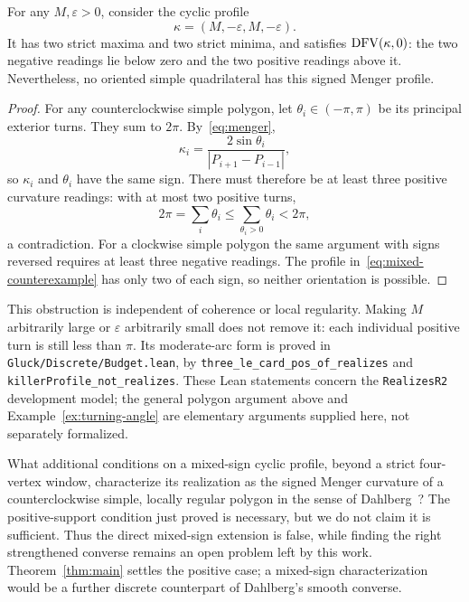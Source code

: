 \begin{example}\label{ex:mixed-sign}
For any $M,\varepsilon>0$, consider the cyclic profile
\begin{equation}\label{eq:mixed-counterexample}
 \kappa=(M,-\varepsilon,M,-\varepsilon).
\end{equation}
It has two strict maxima and two strict minima, and satisfies
$\operatorname{DFV}(\kappa,0)$: the two negative readings lie below zero and the two
positive readings above it. Nevertheless, no oriented simple quadrilateral
has this signed Menger profile.
\end{example}

\begin{proof}
For any counterclockwise simple polygon, let $\theta_i\in(-\pi,\pi)$ be its
principal exterior turns. They sum to $2\pi$. By~\eqref{eq:menger},
\[
 \kappa_i=\frac{2\sin\theta_i}{|P_{i+1}-P_{i-1}|},
\]
so $\kappa_i$ and $\theta_i$ have the same sign. There must therefore be at
least three positive curvature readings: with at most two positive turns,
\[
 2\pi=\sum_i\theta_i
 \le \sum_{\theta_i>0}\theta_i<2\pi,
\]
a contradiction. For a clockwise simple polygon the same argument with
signs reversed requires at least three negative readings. The profile
in~\eqref{eq:mixed-counterexample} has only two of each sign, so neither
orientation is possible.
\end{proof}

This obstruction is independent of coherence or local regularity. Making
$M$ arbitrarily large or $\varepsilon$ arbitrarily small does not remove it:
each individual positive turn is still less than $\pi$. Its moderate-arc
form is proved in \nolinkurl{Gluck/Discrete/Budget.lean}, by
\texttt{three\_le\_card\_pos\_of\_realizes} and
\texttt{killerProfile\_not\_realizes}. These Lean statements concern the
\texttt{RealizesR2} development model; the general polygon argument above
and Example~\ref{ex:turning-angle} are elementary arguments supplied here,
not separately formalized.

What additional conditions on a mixed-sign cyclic profile, beyond a strict
four-vertex window, characterize its realization as the signed Menger
curvature of a counterclockwise simple, locally regular polygon in the
sense of Dahlberg~\cite{Dahlberg2008}? The positive-support condition just
proved is necessary, but we do not claim it is sufficient. Thus the direct
mixed-sign extension is false, while finding the right strengthened
converse remains an open problem left by this work. Theorem~\ref{thm:main}
settles the positive case; a mixed-sign characterization would be a further
discrete counterpart of Dahlberg's smooth converse.
